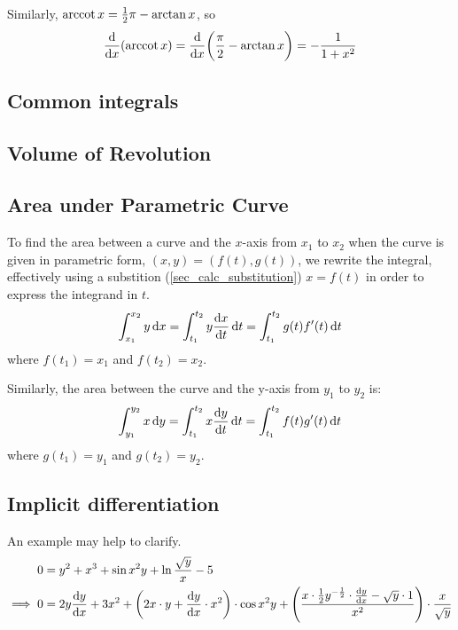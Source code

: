 \documentclass[fleqn,a4paper,11pt]{article}
\begin{document}
    Similarly, \(\arccot x = \frac 12 \pi - \arctan x\), so
    \begin{equation*}
    \dv{x}(\arccot x) = \dv{x}(\frac \pi 2 - \arctan x) = -\frac{1}{1 + x^2}
    \end{equation*}

    \subsection{Common integrals}

    \subsection{Volume of Revolution}

    \subsection{Area under Parametric Curve} \label{sec_calc_parametric_area}

    To find the area between a curve and the \(x\)-axis from \(x_1\) to \(x_2\)
    when the curve is given in parametric form, \((x, y) = (f(t), g(t))\),
    we rewrite the integral, effectively using a substition
    (\ref{sec_calc_substitution}) \(x = f(t)\) in order to express the integrand
    in \(t\).
    \begin{equation}
    \int_{x_1}^{x_2} y \dd{x} =
     \int_{t_1}^{t_2} y \dv{x}{t} \dd{t} =
     \int_{t_1}^{t_2} g(t)f'(t) \dd{t}
    \end{equation}
    where \(f(t_1) = x_1\) and \(f(t_2) = x_2\).

    Similarly, the area between the curve and the y-axis from \(y_1\) to \(y_2\)
    is:
    \begin{equation}
    \int_{y_1}^{y_2} x \dd{y} =
     \int_{t_1}^{t_2} x \dv{y}{t} \dd{t} =
     \int_{t_1}^{t_2} f(t)g'(t) \dd{t}
    \end{equation}
    where \(g(t_1) = y_1\) and \(g(t_2) = y_2\).

    \subsection{Implicit differentiation}



    An example may help to clarify.
    \begin{align*}
    0 &= y^2 + x^3 + \sin x^2 y + \ln \frac{\sqrt y} x - 5 \\
    \implies 0 &=
                2y \dv{y}{x} + 3x^2 +
                \pqty{2x \cdot y + \dv{y}{x} \cdot x^2} \cdot \cos x^2 y +
                \pqty{\frac{x \cdot \frac 12 y^{-\frac 12} \cdot \dv{y}{x} -
                            \sqrt y \cdot 1}
                           {x^2}} \cdot \frac{x}{\sqrt y} \\
    \end{align*}
\end{document}
